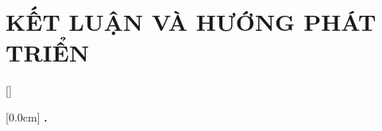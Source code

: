 \documentclass[a4paper,13pt,3p,twoside]{report}
\renewcommand{\bibname}{Danh_sach_tai_lieu_tham_khao}
\theoremstyle{definition}
\begin{document}
\chapter{KẾT LUẬN VÀ HƯỚNG PHÁT TRIỂN} %
\label{chapter:conclusion}


\newpage
% 


\newpage
\renewcommand\bibname{TÀI LIỆU THAM KHẢO}
\printbibliography
{}

\appendixpage
\appendices
\addappheadtotoc


{}[]
\titlespacing*{\chapter}{0pt}{-20pt}{20pt}

    [0.0cm]             %
    {\bfseries\vspace{0.3cm}}                  %
    {{\bfseries{\scshape} \thecontentslabel.\ }} %
    {}         %
    {\contentspage}         %
% 
% 
\end{document}
